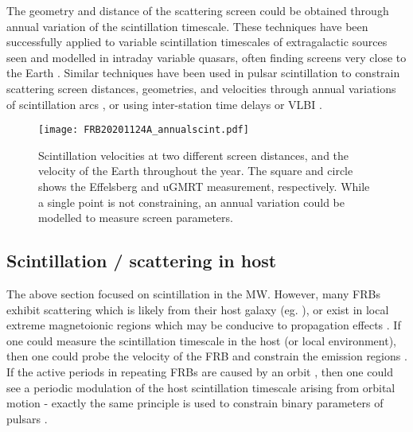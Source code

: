 \documentclass[fleqn,usenatbib]{mnras}
\begin{document}

The geometry and distance of the scattering screen could be obtained through annual variation of the scintillation timescale.  These techniques have been successfully applied to variable scintillation timescales of extragalactic sources seen and modelled in intraday variable quasars, often finding screens very close to the Earth \citep{bignall+03, walker+09}. Similar techniques have been used in pulsar scintillation to constrain scattering screen distances, geometries, and velocities through annual variations of scintillation arcs \citep{rickett+14, reardon+20, main+20}, or using inter-station time delays or VLBI \citep{brisken+10, simard+19}.

\begin{figure}
    \centering
    \texttt{[image: FRB20201124A\_annualscint.pdf]} \\
    \caption{Scintillation velocities at two different screen distances, and the velocity of the Earth throughout the year.  The square and circle shows the Effelsberg and uGMRT measurement, respectively. While a single point is not constraining, an annual variation could be modelled to measure screen parameters. }
    \label{fig:scintvelocity}
\end{figure}

\subsection{Scintillation / scattering in host}

The above section focused on scintillation in the MW.  However, many FRBs exhibit scattering which is likely from their host galaxy (eg. \citealt{masui+15}), or exist in local extreme magnetoionic regions which may be conducive to propagation effects \citep{michilli+18, hessels+19, hilmarsson+21}.  If one could measure the scintillation timescale in the host (or local environment), then one could probe the velocity of the FRB and constrain the emission regions \citep{simard+20}.  If the active periods in repeating FRBs are caused by an orbit \citep{16DaiOrbit, 20IokaOrbit}, then one could see a periodic modulation of the host scintillation timescale arising from orbital motion - exactly the same principle is used to constrain binary parameters of pulsars \citep{lyne84, rickett+14, reardon+20}.
\end{document}
